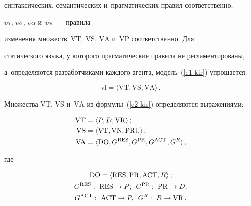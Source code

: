 синтаксических, семантических и~прагматических правил соответственно; 


$\upsilon\tau$, $\upsilon\sigma$, $\upsilon\alpha$ и~$\upsilon\pi$~--- правила 


изменения множеств~$\mathrm{VT}$, $\mathrm{VS}$, $\mathrm{VA}$ и~$\mathrm{VP}$ соответственно. Для 


статического языка, у которого прагматические правила не регламентированы, 


а~определяются разработчиками каждого агента, модель~(\ref{e1-kir}) упрощается: 


\begin{equation}


\mathrm{vl}=\langle \mathrm{VT}, \mathrm{VS}, \mathrm{VA}\rangle\,.


\label{e2-kir}


\end{equation}


  


  Множества $\mathrm{VT}$, $\mathrm{VS}$ и~$\mathrm{VA}$ из формулы~(\ref{e2-kir}) определяются выражениями:


  \begin{align}


  \mathrm{VT}&=\langle P, D, \mathrm{VR}\rangle\,;\notag\\




  \mathrm{VS}&=\langle \mathrm{VT}, \mathrm{VN}, \mathrm{PRU}\rangle\,;\notag




  \\


   \mathrm{VA} &= \langle \mathrm{DO}, G^{\mathrm{RES}}, G^{\mathrm{PR}}, 


   G^{\mathrm{ACT}}, G^R\rangle\,,


     \label{e5-kir}


   \end{align}


   где


   \begin{gather*}


\mathrm{DO}=\langle \mathrm{RES}, \mathrm{PR}, \mathrm{ACT}, R\rangle\,;\\


  G^{\mathrm{RES}} :\ \mathrm{RES}\to P;\enskip G^{\mathrm{PR}}:\ \mathrm{PR}\to D;\\


  G^{\mathrm{ACT}}:\ \mathrm{ACT}\to 


P,\enskip G^R:\ R\to \mathrm{VR}\,.


    \end{gather*}


